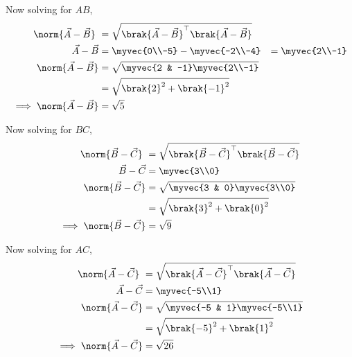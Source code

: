 \documentclass[11pt]{book}
\begin{document}
\begin{enumerate}[label=\thesection.\arabic*.,ref=\thesection.\theenumi]
Now solving for $AB$,\\
\begin{align}
\norm{\vec{A}-\vec{B}}\ &=  \sqrt{\brak{\vec{A}-\vec{B}}^{\top}\brak{\vec{A}-\vec{B}}} \\
	\vec{A}-\vec{B} &= \myvec{0\\-5} - \myvec{-2\\-4} &= \myvec{2\\-1}\\
\norm{\vec{A}-\vec{B}} &= \sqrt{\myvec{2 & -1}\myvec{2\\-1}}\\
&= \sqrt{\brak{2}^2 +\brak{-1}^2}\\
	\implies \norm{\vec{A}-\vec{B}} &=\sqrt{5}
\end{align}

Now solving for $BC$,\\
\begin{align}
	\norm{\vec{B}-\vec{C}}\ &=  \sqrt{\brak{\vec{B}-\vec{C}}^{\top}\brak{\vec{B}-\vec{C}}} \\
\vec{B}-\vec{C} &= \myvec{3\\0}\\
\norm{\vec{B}-\vec{C}} &= \sqrt{\myvec{3 & 0}\myvec{3\\0}}\\
&= \sqrt{\brak{3}^2+\brak{0}^2}\\
\implies \norm{\vec{B}-\vec{C}} &= \sqrt{9}
\end{align}

Now solving for $AC$,\\
\begin{align}
	\norm{\vec{A}-\vec{C}}\ &=  \sqrt{\brak{\vec{A}-\vec{C}}^{\top}\brak{\vec{A}-\vec{C}}} \\
\vec{A}-\vec{C} &= \myvec{-5\\1}\\
\norm{\vec{A}-\vec{C}} &= \sqrt{\myvec{-5 & 1}\myvec{-5\\1}}\\
&= \sqrt{\brak{-5}^2+\brak{1}^2}\\
\implies \norm{\vec{A}-\vec{C}}&=\sqrt{26}
\end{align}


\end{enumerate}
\end{document}
